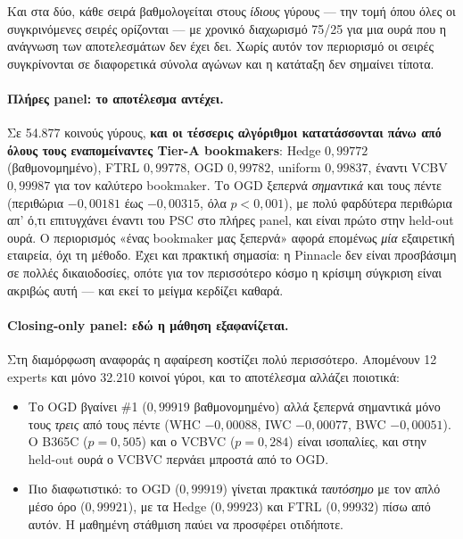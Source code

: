 \documentclass[11pt,a4paper]{article}
\renewcommand{\_}{\oldunderscore\allowbreak}
\begin{document}
Και στα δύο, κάθε σειρά βαθμολογείται στους \emph{ίδιους} γύρους --- την τομή όπου όλες οι
συγκρινόμενες σειρές ορίζονται --- με χρονικό διαχωρισμό 75/25 για μια ουρά που η ανάγνωση
των αποτελεσμάτων δεν έχει δει. Χωρίς αυτόν τον περιορισμό οι σειρές συγκρίνονται σε
διαφορετικά σύνολα αγώνων και η κατάταξη δεν σημαίνει τίποτα.

\paragraph{Πλήρες panel: το αποτέλεσμα αντέχει.} Σε 54.877 κοινούς γύρους, \textbf{και οι
τέσσερις αλγόριθμοι κατατάσσονται πάνω από όλους τους εναπομείναντες Tier-A bookmakers}:
Hedge $0{,}99772$ (βαθμονομημένο), FTRL $0{,}99778$, OGD $0{,}99782$, uniform $0{,}99837$,
έναντι VC\_BV $0{,}99987$ για τον καλύτερο bookmaker. Το OGD ξεπερνά \emph{σημαντικά} και
τους πέντε (περιθώρια $-0{,}00181$ έως $-0{,}00315$, όλα $p<0{,}001$), με πολύ φαρδύτερα
περιθώρια απ' ό,τι επιτυγχάνει έναντι του PSC στο πλήρες panel, και είναι πρώτο στην
held-out ουρά. Ο περιορισμός «ένας bookmaker μας ξεπερνά» αφορά επομένως \emph{μία}
εξαιρετική εταιρεία, όχι τη μέθοδο. Έχει και πρακτική σημασία: η Pinnacle δεν είναι
προσβάσιμη σε πολλές δικαιοδοσίες, οπότε για τον περισσότερο κόσμο η κρίσιμη σύγκριση είναι
ακριβώς αυτή --- και εκεί το μείγμα κερδίζει καθαρά.

\paragraph{Closing-only panel: εδώ η μάθηση εξαφανίζεται.} Στη διαμόρφωση αναφοράς η
αφαίρεση κοστίζει πολύ περισσότερο. Απομένουν 12 experts και μόνο 32.210 κοινοί γύροι, και
το αποτέλεσμα αλλάζει ποιοτικά:

\begin{itemize}
  \item Το OGD βγαίνει \#1 ($0{,}99919$ βαθμονομημένο) αλλά ξεπερνά σημαντικά μόνο τους
        \emph{τρεις} από τους πέντε (WHC $-0{,}00088$, IWC $-0{,}00077$, BWC $-0{,}00051$).
        Ο B365C ($p=0{,}505$) και ο VC\_BVC ($p=0{,}284$) είναι ισοπαλίες, και στην held-out
        ουρά ο VC\_BVC περνάει μπροστά από το OGD.
  \item Πιο διαφωτιστικό: το OGD ($0{,}99919$) γίνεται πρακτικά \emph{ταυτόσημο} με τον απλό
        μέσο όρο ($0{,}99921$), με τα Hedge ($0{,}99923$) και FTRL ($0{,}99932$) πίσω από
        αυτόν. Η μαθημένη στάθμιση παύει να προσφέρει οτιδήποτε.
\end{itemize}
\end{document}
